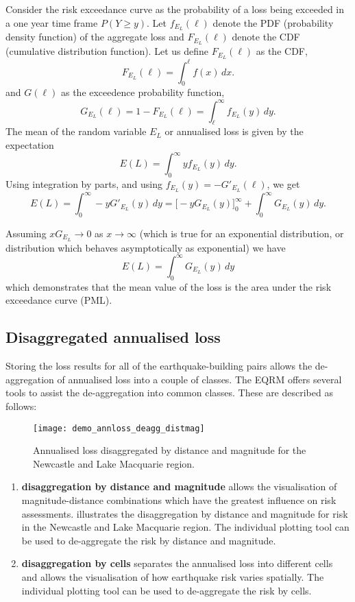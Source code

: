 Consider the risk exceedance curve as the probability of a loss
being exceeded in a one year time frame $P(Y \ge y)$. Let
$f_{E_L}(\ell)$ denote the PDF (probability density function) of
the aggregate loss and $F_{E_L}(\ell)$ denote the CDF (cumulative
distribution function). Let us define $F_{E_L}(\ell)$ as the CDF,
$$
 F_{E_L}(\ell) = \int_0^\ell f(x)\, dx.
$$
and $G(\ell)$ as the exceedence probability function,
$$
 G_{E_L}(\ell) = 1 - F_{E_L}(\ell) = \int_\ell^\infty f_{E_L}(y)\,dy.
$$
The mean of the random variable $E_L$ or annualised loss is given
by the expectation
$$
 E(L) = \int_0^\infty y f_{E_L}(y)\,dy.
$$
Using integration by parts, and using $f_{E_L}(y) =
-G'_{E_L}(\ell)$, we get
$$
 E(L) = \int_0^\infty -y G'_{E_L}(y)\,dy
      =  \big[ -yG_{E_L}(y)\big]_0^\infty + \int_0^\infty
      G_{E_L}(y)\,dy.
$$

Assuming $xG_{E_L}\to 0$ as $x\to\infty$ (which is true for an
exponential distribution, or distribution which behaves
asymptotically as exponential) we have
$$
 E(L) = \int_0^\infty G_{E_L}(y)\,dy
$$
which demonstrates that the mean value of the loss is the area
under the risk exceedance curve (PML).


\subsection{Disaggregated annualised loss}

Storing the loss results for all of the earthquake-building pairs
allows the de-aggregation of annualised loss into a couple of
classes. The EQRM offers several tools to assist the
de-aggregation into common classes. These
are described as follows:
\begin{figure}
\texttt{[image: demo\_annloss\_deagg\_distmag]}
 \caption{Annualised loss
disaggregated by distance and magnitude for the Newcastle and Lake
Macquarie region.} \label{fig-risk-deaggdistmag}
\end{figure}

\begin{enumerate}
\item \textbf{disaggregation by distance and magnitude} allows the
visualisation of magnitude-distance combinations which have the
greatest influence on risk assessments.
 illustrates the disaggregation by
distance and magnitude for risk in the Newcastle and Lake
Macquarie region. The individual plotting tool
 can be used
to de-aggregate the risk by
distance and magnitude. 

\item \textbf{disaggregation by cells} separates
the annualised loss into different cells and allows the
visualisation of how earthquake risk varies spatially. The
individual plotting tool
 can be used 
 to de-aggregate the risk by
cells. 
\end{enumerate}

